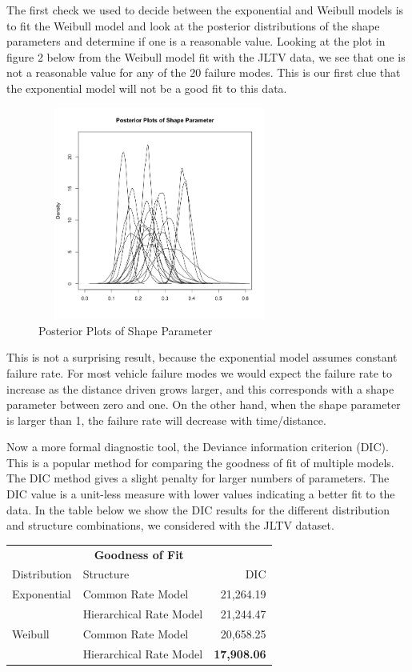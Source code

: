 \documentclass[12pt]{article}
\begin{document}
The first check we used to decide between the exponential and Weibull models is
to fit the Weibull model and look at the posterior distributions of the shape
parameters and determine if one is a reasonable value.  Looking at the plot in
figure 2 below from the Weibull model fit with the JLTV data, we see that one is
not a reasonable value for any of the 20 failure modes.  This is our first clue
that the exponential model will not be a good fit to this data.

\begin{figure}[h]
  \centering
      \includegraphics[width=8cm, height=7cm]{shapePostPlot}
  \caption{Posterior Plots of Shape Parameter}
\end{figure}

This is not a surprising result, because the exponential model assumes constant
failure rate.  For most vehicle failure modes we would expect the failure rate to
increase as the distance driven grows larger, and this corresponds with a shape
parameter between zero and one.  On the other hand, when the shape parameter is
larger than 1, the failure rate will decrease with time/distance.

Now a more formal diagnostic tool, the Deviance information criterion (DIC).
This is a popular method for comparing the goodness of fit of multiple models.
The DIC method gives a slight penalty for larger numbers of parameters.  The DIC
value is a unit-less measure with lower values indicating a better fit to the
data.  In the table below we show the DIC results for the different distribution
and structure combinations, we considered with the JLTV dataset.

\begin{table}[h]
\centering
\begin{tabular}{|l|l|r|}
\multicolumn{3}{c}{\textbf{Goodness of Fit}} \\
\cline{1-3}
Distribution    & Structure & DIC \\
\hline
Exponential   & Common Rate Model                     & 21,264.19             \\
              & Hierarchical Rate Model               & 21,244.47             \\
Weibull       & Common Rate Model                     & 20,658.25             \\
              & Hierarchical Rate Model               & \textbf{17,908.06}    \\
\hline
\end{tabular}
\end{table}
\end{document}
